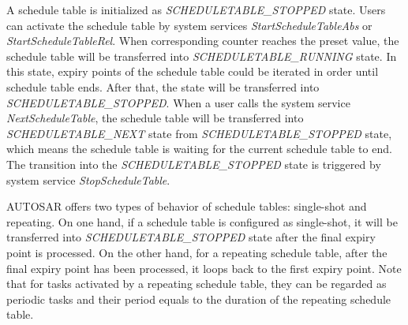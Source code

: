 \documentclass[10pt,conference]{IEEEtran}
\begin{document}
A schedule table is initialized as \emph{SCHEDULETABLE\_STOPPED} state. Users can activate the schedule table by system services \emph{StartScheduleTableAbs} or \emph{StartScheduleTableRel}. When corresponding counter reaches the preset value, the schedule table will be transferred into \emph{SCHEDULETABLE\_RUNNING} state. In this state, expiry points of the schedule table could be iterated in order until schedule table ends. After that, the state will be transferred into \emph{SCHEDULETABLE\_STOPPED}. When a user calls the system service \emph{NextScheduleTable}, the schedule table will be transferred into \emph{SCHEDULETABLE\_NEXT} state from \emph{SCHEDULETABLE\_STOPPED} state, which means the schedule table is waiting for the current schedule table to end. The transition into the \emph{SCHEDULETABLE\_STOPPED} state is triggered by system service \emph{StopScheduleTable}.


AUTOSAR offers two types of behavior of schedule tables: single-shot and repeating. On one hand, if a schedule table is configured as single-shot, it will be transferred into \emph{SCHEDULETABLE\_STOPPED} state after the final expiry point is processed. On the other hand, for a repeating schedule table, after the final expiry point has been processed, it loops back to the first expiry point. Note that for tasks activated by a repeating schedule table, they can be regarded as periodic tasks and their period equals to the duration of the repeating schedule table.
\end{document}
